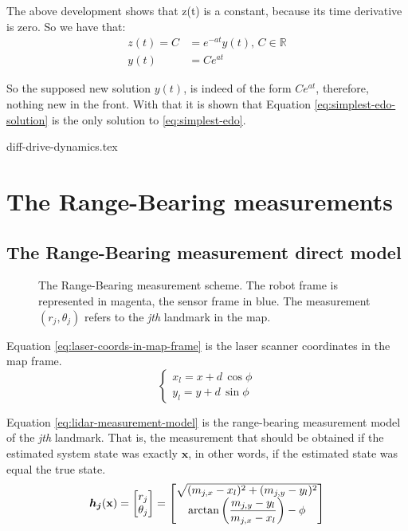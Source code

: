 \documentclass[12pt]{article}
\begin{document}
The above development shows that z(t) is a constant, because its time derivative is zero. So we have that:
\begin{align*}
    z(t) = C &= e^{-at} y(t), \, C \in \mathbb{R}\\
    y(t) &= C e^{at}
\end{align*}

So the supposed new solution $y(t)$, is indeed of the form $C e^{at}$, therefore, nothing new in the front. With that it is shown that Equation \ref{eq:simplest-edo-solution} is the only solution to \ref{eq:simplest-edo}.

{diff-drive-dynamics.tex}
%

\section{The Range-Bearing measurements}
\subsection{The Range-Bearing measurement direct model}
\begin{figure}[h]
    \centering
    
    \caption{The Range-Bearing measurement scheme. The robot frame is represented in magenta, the sensor frame in blue. The measurement $(r_j, \theta_j)$ refers to the \textit{jth} landmark in the map.}
    \label{fig:range-bearing-measurement-schematic}
\end{figure}

Equation \ref{eq:laser-coords-in-map-frame} is the laser scanner coordinates in the map frame.
\begin{equation}
    \begin{cases}
    x_l = x + d\,\cos\phi \\
    y_l = y + d\,\sin\phi 
    \end{cases}
    \label{eq:laser-coords-in-map-frame}
\end{equation}

Equation \ref{eq:lidar-measurement-model} is the range-bearing measurement model of the \textit{jth} landmark. That is, the measurement that should be obtained if the estimated system state was exactly $\mathbf{x}$, in other words, if the estimated state was equal the true state.
\renewcommand{\arraystretch}{1.5}
\begin{equation}
    {\boldsymbol{h_j}}(\mathbf{x}) = \begin{bmatrix}
        r_j \\ \theta_j     
    \end{bmatrix} = 
    \begin{bmatrix}
        \sqrt{(m_{j,x} - x_l)^2 + (m_{j, y} - y_l)^2} \\
        \arctan\left(\dfrac{m_{j,y} - y_l}{m_{j,x} - x_l}\right) - \phi
    \end{bmatrix}
    \label{eq:lidar-measurement-model}
\end{equation}
\renewcommand{\arraystretch}{1.0}
\end{document}
